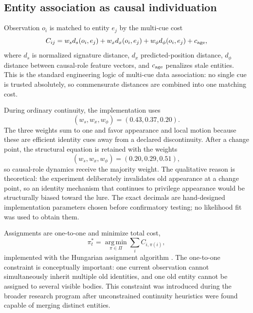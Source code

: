 \documentclass[journal]{IEEEtran}
\newcommand{\argmin}{\operatorname*{arg\,min}}
\begin{document}
\subsection{Entity association as causal individuation}
Observation $o_i$ is matched to entity $e_j$ by the multi-cue cost
\begin{equation}
C_{ij}=w_s d_s(o_i,e_j)+w_x d_x(o_i,e_j)+w_\phi d_\phi(o_i,e_j)+c_{\rm age},
\label{eq:assoc}
\end{equation}
where $d_s$ is normalized signature distance, $d_x$ predicted-position distance, $d_\phi$ distance between causal-role feature vectors, and $c_{\rm age}$ penalizes stale entities. This is the standard engineering logic of multi-cue data association: no single cue is trusted absolutely, so commensurate distances are combined into one matching cost.

During ordinary continuity, the implementation uses
\begin{equation}
(w_s,w_x,w_\phi)=(0.43,0.37,0.20).
\label{eq:normalweights}
\end{equation}
The three weights sum to one and favor appearance and local motion because these are efficient identity cues away from a declared discontinuity. After a change point, the structural equation is retained with the weights
\begin{equation}
(w_s,w_x,w_\phi)=(0.20,0.29,0.51),
\label{eq:cpweights}
\end{equation}
so causal-role dynamics receive the majority weight. The qualitative reason is theoretical: the experiment deliberately invalidates old appearance at a change point, so an identity mechanism that continues to privilege appearance would be structurally biased toward the lure. The exact decimals are hand-designed implementation parameters chosen before confirmatory testing; no likelihood fit was used to obtain them.

Assignments are one-to-one and minimize total cost,
\begin{equation}
\pi_t^*=\argmin_{\pi\in\Pi}\sum_i C_{i,\pi(i)},
\label{eq:assignment}
\end{equation}
implemented with the Hungarian assignment algorithm \cite{Kuhn1955,Munkres1957}. The one-to-one constraint is conceptually important: one current observation cannot simultaneously inherit multiple old identities, and one old entity cannot be assigned to several visible bodies. This constraint was introduced during the broader research program after unconstrained continuity heuristics were found capable of merging distinct entities.
\end{document}
